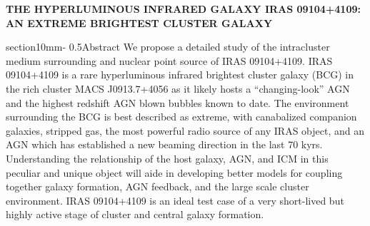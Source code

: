 \documentclass[letterpaper,12pt]{article}
\makeatletter
\renewcommand{\section}{\@startsection%
{section}{1}{0mm}{-\baselineskip}%
{0.5\baselineskip}{\normalfont\Large\bfseries}}%
\makeatother
\begin{document}
\pagestyle{plain}
\begin{center}
\bfseries\uppercase{The Hyperluminous Infrared Galaxy IRAS 09104+4109: An Extreme Brightest Cluster Galaxy}
\end{center}
\section{Abstract}
We propose a detailed study of the intracluster medium surrounding and
nuclear point source of IRAS 09104+4109. IRAS 09104+4109 is a rare
hyperluminous infrared brightest cluster galaxy (BCG) in the rich
cluster MACS J0913.7+4056 as it likely hosts a ``changing-look'' AGN
and the highest redshift AGN blown bubbles known to date. The
environment surrounding the BCG is best described as extreme, with
canabalized companion galaxies, stripped gas, the most powerful radio
source of any IRAS object, and an AGN which has established a new
beaming direction in the last 70 kyrs. Understanding the relationship
of the host galaxy, AGN, and ICM in this peculiar and unique object
will aide in developing better models for coupling together galaxy
formation, AGN feedback, and the large scale cluster environment.
IRAS 09104+4109 is an ideal test case of a very short-lived but highly
active stage of cluster and central galaxy formation.
\end{document}

